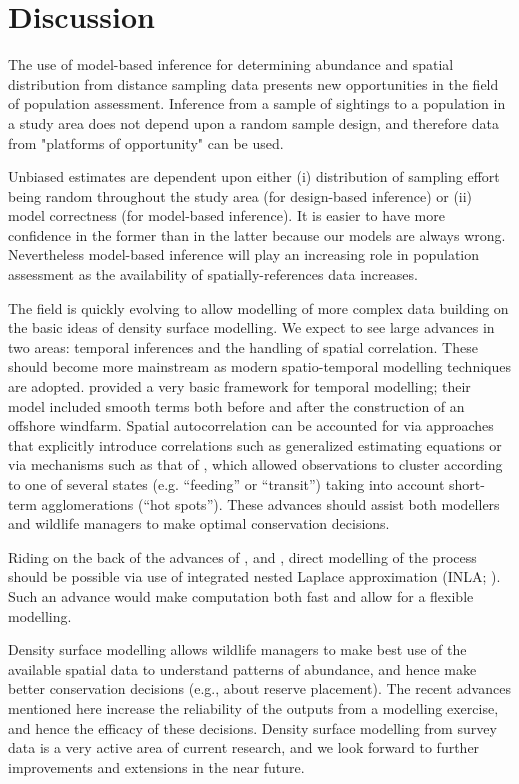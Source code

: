 \documentclass[a4paper,12pt]{article}
\begin{document}
\section*{Discussion}
\label{s:discussion}

The use of model-based inference for determining abundance and spatial distribution from distance sampling data presents new opportunities in the field of population assessment.   Inference from a sample of sightings to a population in a study area does not depend upon a random sample design, and therefore data from "platforms of opportunity" \citep{Williams:2006tz} can be used.

Unbiased estimates are dependent upon either (i) distribution of sampling effort being random throughout the study area (for design-based inference) or (ii) model correctness (for model-based inference).  It is easier to have more confidence in the former than in the latter because our models are always wrong. Nevertheless model-based inference will play an increasing role in population assessment as the availability of spatially-references data increases.

The field is quickly evolving to allow modelling of more complex data building on the basic ideas of density surface modelling. We expect to see large advances in two areas: temporal inferences and the handling of spatial correlation. These should become more mainstream as modern spatio-temporal modelling techniques are adopted. \cite{Petersen:2011vy} provided a very basic framework for temporal modelling; their model included smooth terms both before and after the construction of an offshore windfarm. Spatial autocorrelation can be accounted for via approaches that explicitly introduce correlations such as generalized estimating equations \cite[GEEs;][]{Hardin:2003uf} or via mechanisms such as that of \cite{Skaug:2006gs}, which allowed observations to cluster according to one of several states (e.g. ``feeding'' or ``transit'') taking into account short-term agglomerations (``hot spots''). These advances should assist both modellers and wildlife managers to make optimal conservation decisions. 

Riding on the back of the advances of \cite{Royle:2004tu}, \cite{Niemi:2010kx} and \cite{Johnson:2010gf}, direct modelling of the process should be possible via use of integrated nested Laplace approximation (INLA; \cite{Rue:2009tw}). Such an advance would make computation both fast and allow for a flexible modelling.

Density surface modelling allows wildlife managers to make best use of the available spatial data to understand patterns of abundance, and hence make better conservation decisions (e.g., about reserve placement). The recent advances mentioned here increase the reliability of the outputs from a modelling exercise, and hence the efficacy of these decisions.  Density surface modelling from survey data is a very active area of current research, and we look forward to further improvements and extensions in the near future.
\end{document}
